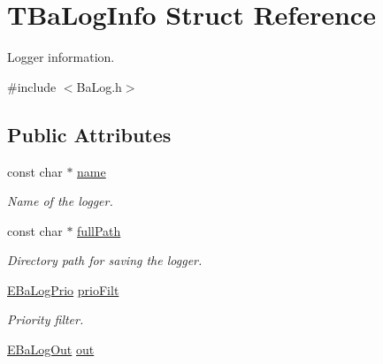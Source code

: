 \hypertarget{structTBaLogInfo}{}\section{T\+Ba\+Log\+Info Struct Reference}
\label{structTBaLogInfo}


Logger information.  




{\ttfamily \#include $<$Ba\+Log.\+h$>$}

\subsection*{Public Attributes}
\begin{DoxyCompactItemize}
\item 
\hypertarget{structTBaLogInfo_a6fe0471fbe5aee2253366cd72f3fcfd2}{}const char $\ast$ \hyperlink{structTBaLogInfo_a6fe0471fbe5aee2253366cd72f3fcfd2}{name}\label{structTBaLogInfo_a6fe0471fbe5aee2253366cd72f3fcfd2}

\begin{DoxyCompactList}\small\item\em Name of the logger. \end{DoxyCompactList}\item 
\hypertarget{structTBaLogInfo_aad77a8e412b731cb1f746fc2eec116a3}{}const char $\ast$ \hyperlink{structTBaLogInfo_aad77a8e412b731cb1f746fc2eec116a3}{full\+Path}\label{structTBaLogInfo_aad77a8e412b731cb1f746fc2eec116a3}

\begin{DoxyCompactList}\small\item\em Directory path for saving the logger. \end{DoxyCompactList}\item 
\hypertarget{structTBaLogInfo_a756157c50cdaf559e7e4705a9644d926}{}\hyperlink{BaLog_8h_ab14f00a81932b8b62d2e8c4a2d7e3916}{E\+Ba\+Log\+Prio} \hyperlink{structTBaLogInfo_a756157c50cdaf559e7e4705a9644d926}{prio\+Filt}\label{structTBaLogInfo_a756157c50cdaf559e7e4705a9644d926}

\begin{DoxyCompactList}\small\item\em Priority filter. \end{DoxyCompactList}\item 
\hypertarget{structTBaLogInfo_af72f79042561752b9a55b2429374d6e6}{}\hyperlink{BaLog_8h_a1f5f5789212a206b457c4446abaf81c4}{E\+Ba\+Log\+Out} \hyperlink{structTBaLogInfo_af72f79042561752b9a55b2429374d6e6}{out}\label{structTBaLogInfo_af72f79042561752b9a55b2429374d6e6}


\end{DoxyCompactItemize}
